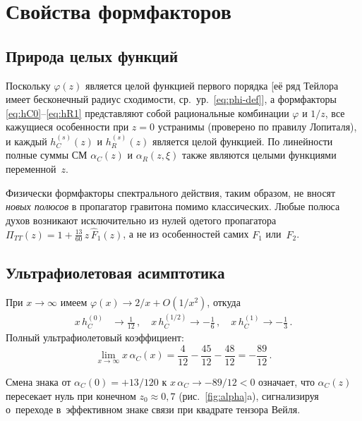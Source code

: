 \documentclass[12pt,a4paper]{article}
\begin{document}
\section{Свойства формфакторов}
\label{sec:properties}

\subsection{Природа целых функций}

Поскольку $\varphi(z)$ является целой функцией первого порядка [её ряд Тейлора
имеет бесконечный радиус сходимости, ср.~ур.~\eqref{eq:phi-def}], а
формфакторы \eqref{eq:hC0}--\eqref{eq:hR1} представляют собой рациональные
комбинации $\varphi$ и $1/z$, все кажущиеся особенности при $z = 0$ устранимы
(проверено по правилу Лопиталя), и каждый $h_C^{(s)}(z)$ и $h_R^{(s)}(z)$
является целой функцией. По линейности полные суммы СМ $\alpha_C(z)$ и
$\alpha_R(z,\xi)$ также являются целыми функциями переменной~$z$.

Физически формфакторы спектрального действия, таким образом, не вносят
\emph{новых полюсов} в пропагатор гравитона помимо классических. Любые
полюса духов возникают исключительно из нулей одетого пропагатора
$\Pi_{TT}(z) = 1 + \frac{13}{60}\,z\,\hat{F}_1(z)$, а не из особенностей
самих $F_1$ или~$F_2$.

\subsection{Ультрафиолетовая асимптотика}

При $x \to \infty$ имеем $\varphi(x) \to 2/x + O(1/x^2)$, откуда
\begin{align}
  x\,h_C^{(0)} &\to \frac{1}{12}\,,\quad
  x\,h_C^{(1/2)} \to -\frac{1}{6}\,,\quad
  x\,h_C^{(1)} \to -\frac{1}{3}\,.
\end{align}
Полный ультрафиолетовый коэффициент:
\begin{equation}
  \lim_{x\to\infty} x\,\alpha_C(x)
    = \frac{4}{12} - \frac{45}{12} - \frac{48}{12}
    = -\frac{89}{12}\,.
  \label{eq:uv-coeff}
\end{equation}

Смена знака от $\alpha_C(0) = +13/120$ к
$x\,\alpha_C \to -89/12 < 0$ означает, что $\alpha_C(z)$ пересекает нуль
при конечном $z_0 \approx 0{,}7$ (рис.~\ref{fig:alpha}a), сигнализируя
о~переходе в~эффективном знаке связи при квадрате тензора Вейля.
\end{document}
